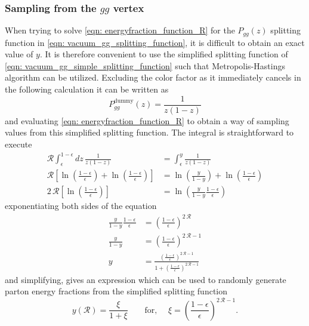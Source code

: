 \documentclass[main.tex]{subfiles}
\begin{document}
\subsubsection*{Sampling from the \(gg\) vertex}
When trying to solve \autoref{eqn: energyfraction_function_R} for the \(P_{gg}(z)\) splitting function in \autoref{eqn: vacuum_gg_splitting_function}, it is difficult to obtain an exact value of \(y\). It is therefore convenient to use the simplified splitting function of \autoref{eqn: vacuum_gg_simple_splitting_function} such that Metropolis-Hastings algorithm can be utilized. Excluding the color factor as it immediately cancels in the following calculation it can be written as
\begin{equation}\label{eqn: p_ggg_vacuum_dummy}
    P_{gg}^{\text{dummy}}(z) = \frac{1}{z(1-z)}
\end{equation}
and evaluating \autoref{eqn: energyfraction_function_R} to obtain a way of sampling values from this simplified splitting function. The integral is straightforward to execute
\begin{align}
    \mathcal{R} \int_\epsilon^{1-\epsilon} dz \, \frac{1}{z(1-z)} &= \int_\epsilon^{y} \frac{1}{z(1-z)}  \nonumber\\
    \mathcal{R} \left[ \ln (\frac{1-\epsilon}{\epsilon}) +   \ln(\frac{1-\epsilon}{\epsilon}) \right] &= \ln (\frac{y}{1-y}) +  \ln(\frac{1-\epsilon}{\epsilon}) \nonumber\\
    2\, \mathcal{R} \left[ \ln (\frac{1-\epsilon}{\epsilon}) \right] &= \ln (\frac{y}{1-y}  \frac{1-\epsilon}{\epsilon})
\end{align}
exponentiating both sides of the equation
\begin{align}\label{eqn: MC_energyfraction_origin_vacuum}
    \frac{y}{1-y} \frac{1-\epsilon}{\epsilon} &= \left(\frac{1-\epsilon}{\epsilon}\right)^{2\, \mathcal{R}} \nonumber\\
    \frac{y}{1-y} &= \left(\frac{1-\epsilon}{\epsilon}\right)^{2\, \mathcal{R}-1} \nonumber\\
    y &= \frac{\left(\frac{1-\epsilon}{\epsilon}\right)^{2\, \mathcal{R}-1}}{1+\left(\frac{1-\epsilon}{\epsilon}\right)^{2\, \mathcal{R}-1}}
\end{align}
and simplifying, gives an expression which can be used to randomly generate parton energy fractions from the simplified splitting function
\begin{equation}\label{eqn: MC_energyfraction_gg_vacuum}
    y(\mathcal{R}) = \frac{\xi}{1+ \xi} \qquad \text{for, } \quad \xi = \left(\frac{1-\epsilon}{\epsilon}\right)^{2\, \mathcal{R}-1}.
\end{equation}
\end{document}
